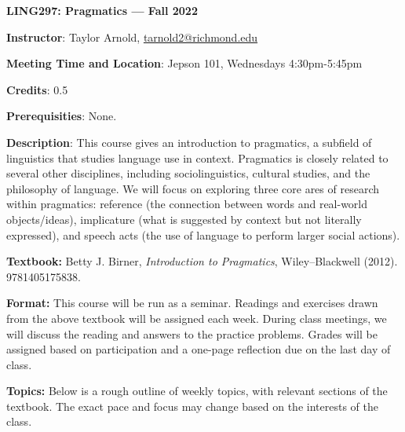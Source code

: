 \documentclass[11pt, a4paper]{article}
\begin{document}
\begin{center}
\textbf{LING297: Pragmatics --- Fall 2022}
\end{center}

\vspace{0.5cm}


\textbf{Instructor}: Taylor Arnold, \url{tarnold2@richmond.edu}

\bigskip


\textbf{Meeting Time and Location}: Jepson 101, Wednesdays 4:30pm-5:45pm

\bigskip

\textbf{Credits}: 0.5

\bigskip

\textbf{Prerequisities}: None.

\bigskip

\textbf{Description}: This course gives an introduction to pragmatics,
a subfield of linguistics that studies language use in context. Pragmatics
is closely related to several other disciplines, including sociolinguistics,
cultural studies, and the philosophy of language. We will focus on
exploring three core ares of research within pragmatics: reference (the connection
between words and real-world objects/ideas), implicature (what is suggested by
context but not literally expressed), and speech acts (the use of language to
perform larger social actions).

\bigskip

\textbf{Textbook:}
Betty J. Birner, \textit{Introduction to Pragmatics},
Wiley--Blackwell (2012). 9781405175838.

\bigskip

\textbf{Format:}
This course will be run as a seminar. Readings and exercises
drawn from the above textbook will be assigned each week. During class meetings,
we will discuss the reading and answers to the practice problems. Grades will
be assigned based on participation and a one-page reflection due on the last
day of class.

\bigskip

\textbf{Topics:}
Below is a rough outline of weekly topics, with relevant sections of the textbook.
The exact pace and focus may change based on the interests of the class.
\end{document}
